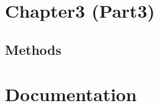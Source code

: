 \newpage
\null
\thispagestyle{empty}
\newpage
\chapter{Chapter3 (Part3)}
\section*{Methods}


\newpage
\null
\thispagestyle{empty}
\newpage

\chapter{Documentation}
\label{ch:Extra_documents}
%

